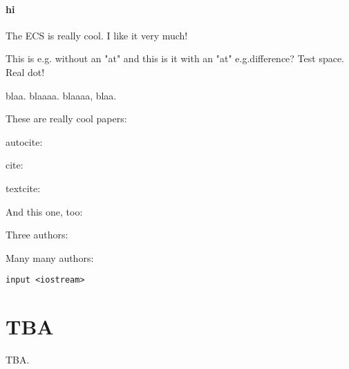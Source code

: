 \paragraph{hi}

The \ac{ECS} is really cool. I like it very much!

This is e.g. without an "at" and this is it with an "at" e.g.\@ difference?
Test space. Real dot!

\Eg blaa. \Eg{} blaaaa. \ie blaaaa, \ie{} blaa.

These are really cool papers: \autocite{Schlund2020, Schlund2020a}

autocite:
\autocite{Lauer2018}

cite:
\cite{Lauer2010}
\autocite{Anav2015}
\autocite{Anav2013}
\autocite{Allen2002}

textcite:
\textcite{Lauer2010}

And this one, too: \autocite{Lauer2020}

Three authors: \autocite{Bao2020}

Many many authors: \autocite{Eyring2020}

\texttt{input <iostream>}


\section{TBA}

TBA.